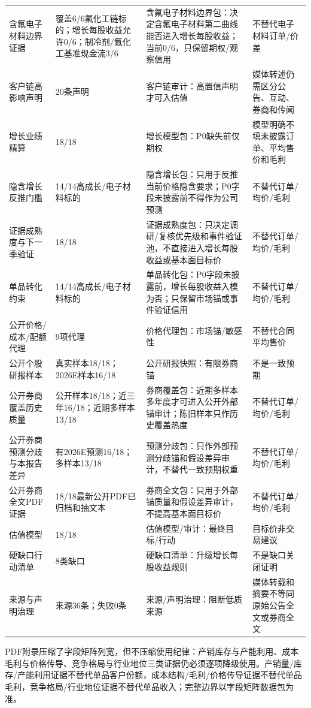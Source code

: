 \begin{exhibitbox}
\begin{tabularx}{\exhibitboxwidth}{L{2.1cm} L{1.65cm} X X}
含氟电子材料边界证据 & 覆盖6/6氟化工链标的；增长每股收益允许0/6；制冷剂/氟化工基准现金流3/6 & 含氟电子材料边界包：决定含氟电子材料第二曲线能否进入增长每股收益；当前0/6，只保留期权/观察信用 & 不替代电子材料订单/价差 \\
客户链高影响声明 & 20条声明 & 客户链审计：高置信声明才可入估值 & 媒体转述仍需区分公告、互动、券商和传闻 \\
增长业绩精算 & 18/18 & 增长模型包：P0缺失前仅期权 & 模型明确不填未披露订单、平均售价和毛利 \\
隐含增长反推门槛 & 14/14高成长/电子材料标的 & 隐含增长包：只用于反推当前价格隐含要求；P0字段未披露前不得作为公司预测 & 不替代订单/均价/毛利 \\
证据成熟度与下一季验证 & 18/18 & 证据成熟度包：只决定调研/复核优先级和事件验证池，不直接进入增长每股收益或基本面目标价 & 不替代订单/均价/毛利 \\
单品转化约束 & 14/14高成长/电子材料标的 & 单品转化包：P0字段未披露前，增长每股收益入模为否；只保留市场锚或事件验证信用 & 不替代订单/均价/毛利 \\
公开价格/成本/配额代理 & 9项代理 & 价格代理包：市场锚/敏感性 & 不替代合同平均售价 \\
公开个股研报样本 & 真实样本18/18；2026E样本16/18 & 公开研报快照：有限券商锚 & 不是一致预期 \\
公开券商覆盖历史质量 & 公开样本18/18；近三年16/18；近期多样本13/18 & 券商覆盖包：近期多样本多年度才可进入公开外部锚审计；陈旧样本只作历史覆盖热度 & 不替代订单/均价/毛利 \\
公开券商预测分歧与本报告差异 & 有2026E预测16/18；多样本13/18 & 预测分歧包：只作外部预测分歧锚和假设差异审计，不替代一致预期权重 & 不替代订单/均价/毛利 \\
公开券商全文PDF证据 & 18/18最新公开PDF已归档和抽文本 & 券商全文包：只用于外部锚质量和假设差异审计，不提高基本面目标价 & 不替代订单/均价/毛利 \\
估值模型 & 18/18 & 估值模型/审计：最终目标/行动 & 目标价非交易建议 \\
硬缺口行动清单 & 8类缺口 & 硬缺口清单：升级增长每股收益规则 & 不是缺口关闭证明 \\
来源与声明治理 & 来源36条；失败0条 & 来源/声明治理：阻断低质来源 & 媒体转载和摘要不等同原始公告全文或券商全文 \\
\bottomrule
\end{tabularx}
\end{exhibitbox}

PDF附录压缩了字段矩阵列宽，但不压缩使用纪律：产销库存与产能利用、成本毛利与价格传导、竞争格局与行业地位三类证据仍必须逐项降级使用。产销量/库存/产能利用证据不替代单品客户份额，成本结构/毛利/价格传导证据不替代单品毛利，竞争格局/行业地位证据不替代单品收入；完整边界以字段矩阵数据包为准。

